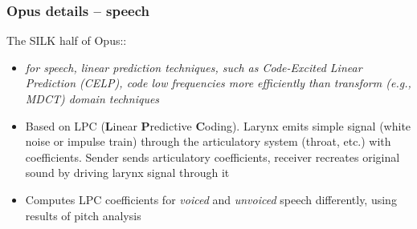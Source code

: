 \documentclass{beamer}
\begin{document}

\begin{frame}
	\frametitle{Opus details -- speech}
	The SILK half of Opus::
	\begin{itemize}
		\item
			\textit{for speech, linear prediction techniques, such as Code-Excited Linear Prediction (CELP), code low frequencies more efficiently than transform (e.g., MDCT) domain techniques}
		\item
			Based on LPC (\textbf{L}inear \textbf{P}redictive \textbf{C}oding). Larynx emits simple signal (white noise or impulse train) through the articulatory system (throat, etc.) with coefficients. Sender sends articulatory coefficients, receiver recreates original sound by driving larynx signal through it
		\item
			Computes LPC coefficients for \textit{voiced} and \textit{unvoiced} speech differently, using results of pitch analysis
	\end{itemize}
\end{frame}

\end{document}
